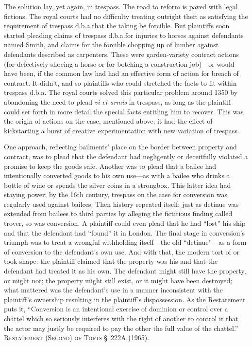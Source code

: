 The solution lay, yet again, in trespass. The road to reform is paved with legal
fictions. The royal courts had no difficulty treating outright theft as
satisfying the requirement of trespass d.b.a.\@ that the taking be forcible. But
plaintiffs soon started pleading claims of trespass d.b.a.\@ for injuries to
horses against defendants named Smith, and claims for the forcible chopping up
of lumber against defendants described as carpenters. These were garden-variety
contract actions (for defectively shoeing a horse or for botching a
construction job)---or would have been, if the common law had had an effective
form of action for breach of contract. It didn't, and so plaintiffs who could
stretched the facts to fit within trespass d.b.a. The royal courts solved this
particular problem around 1350 by abandoning the need to plead \textit{vi et
armis} in trespass, as long as the plaintiff could set forth in more detail the
special facts entitling him to recover. This was the origin of actions on the
case, mentioned above; it had the effect of kickstarting a burst of creative
experimentation with new variation of trespass.

One approach, reflecting bailments' place on the border between property and
contract, was to plead that the defendant had negligently or deceitfully
violated a promise to keep the goods safe. Another was to plead that a bailee
had intentionally converted goods to his own use---as with a bailee who drinks
a bottle of wine or spends the silver coins in a strongbox. This latter idea
had staying power; by the 16th century, trespass on the case for conversion was
regularly used against bailees. Then history repeated itself: just as detinue
was extended from bailees to third parties by alleging the fictitious finding
called trover, so was conversion. A plaintiff could even plead that he had
``lost'' his ship and that the defendant had ``found'' it in London. The final
stage in conversion's triumph was to treat a wrongful withholding itself---the
old ``detinue''---as a form of conversion to the defendant's own use. And with
that, the modern tort of  or  took shape: the
plaintiff claimed that the property was his and that the defendant had treated
it as his own. The defendant might still have the property, or might not; the
property might still exist, or it might have been destroyed; what mattered was
the defendant's use in a manner inconsistent with the plaintiff's ownership
resulting in the plaintiff's dispossession. As the Restatement puts it,
``Conversion is an intentional exercise of dominion or control over a chattel
which so seriously interferes with the right of another to control it that the
actor may justly be required to pay the other the full value of the chattel.''
\textsc{Restatement (Second) of Torts} \S~222A (1965).


